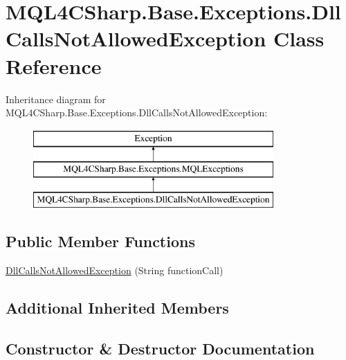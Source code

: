 \hypertarget{class_m_q_l4_c_sharp_1_1_base_1_1_exceptions_1_1_dll_calls_not_allowed_exception}{}\section{M\+Q\+L4\+C\+Sharp.\+Base.\+Exceptions.\+Dll\+Calls\+Not\+Allowed\+Exception Class Reference}
\label{class_m_q_l4_c_sharp_1_1_base_1_1_exceptions_1_1_dll_calls_not_allowed_exception}
Inheritance diagram for M\+Q\+L4\+C\+Sharp.\+Base.\+Exceptions.\+Dll\+Calls\+Not\+Allowed\+Exception\+:\begin{figure}[H]
\begin{center}
\leavevmode
\includegraphics[height=3.000000cm]{class_m_q_l4_c_sharp_1_1_base_1_1_exceptions_1_1_dll_calls_not_allowed_exception}
\end{center}
\end{figure}
\subsection*{Public Member Functions}
\begin{DoxyCompactItemize}
\item 
\hyperlink{class_m_q_l4_c_sharp_1_1_base_1_1_exceptions_1_1_dll_calls_not_allowed_exception_a427107801538f5d3936ff2cf2d49b4d3}{Dll\+Calls\+Not\+Allowed\+Exception} (String function\+Call)
\end{DoxyCompactItemize}
\subsection*{Additional Inherited Members}


\subsection{Constructor \& Destructor Documentation}

